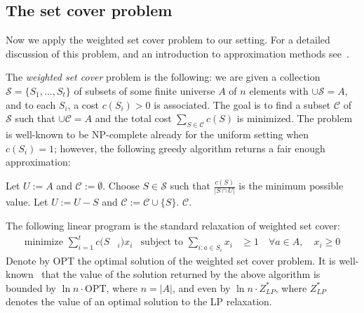 \documentclass[submission]{llncs}
\begin{document}
\subsection{The set cover problem}
  Now we apply the weighted set cover problem to our setting.
  For
a
  detailed discussion of this problem, and an introduction
  to approximation methods
see~\cite{Williamson:2011:DAA:1971947}.

  The \emph{weighted set cover} problem is the following: we are given a collection $\mathcal{S}=\{S_1,\ldots,S_t\}$ of subsets of some finite
  universe $A$ of $n$ elements with $\cup\mathcal{S}=A$, and to each $S_i$, a cost $c(S_i)>0$ is associated.
The goal is to find a subset $\mathcal C$ of $\mathcal S$ such that $\cup\mathcal C=A$ and the total cost $\sum_{S\in\mathcal C} c(S)$ is minimized.
The problem is well-known to be NP-complete already for the uniform setting when $c(S_i)=1$; however, the following greedy algorithm
  returns a fair enough approximation:
\begin{algorithmic}
  \State Let $U:=A$ and $\mathcal{C}:=\emptyset$.
  \State Choose $S\in\mathcal{S}$ such that $\frac{c(S)}{|S\cap U|}$ is the minimum possible value.
  \State Let $U:=U-S$ and $\mathcal{C}:=\mathcal{C}\cup\{S\}$.
  \EndWhile
  \Return $\mathcal{C}$.
  \end{algorithmic}
The following linear program is the standard relaxation of weighted set cover:
\begin{align*}
  \textrm{minimize }  \sum_{i=1}^t c(S&_i) x_i &
\textrm{subject to } \sum_{i: a\in S_i} x_i &\ge 1 \quad \forall a\in A,\quad x_i\ge 0
  \end{align*}
Denote by $\mathrm{OPT}$ the optimal solution of the weighted set cover problem.
It is well-known~\cite{chvatal1979setcover,Johnson:1973:AAC:800125.804034,Lovasz1975383,Stein1974391} that the value of the solution returned by the above algorithm is bounded by $\ln n \cdot \mathrm{OPT}$, where $n=|A|$, and even by $\ln n \cdot Z^*_{LP}$,
  where $Z^*_{LP}$ denotes the value of an optimal solution to the LP relaxation.
\end{document}
